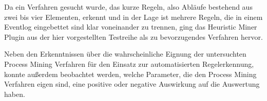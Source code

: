 \begin{table}[!htbp]
\centering
{}
\caption{Ergebnisse der Auswertung der Versuchsreihe}
\label{tab:results_short}
\end{table}

Da ein Verfahren gesucht wurde, das kurze Regeln, also Abläufe bestehend aus zwei bis vier Elementen, erkennt und  in der Lage ist mehrere Regeln, die in einem Eventlog eingebettet sind klar voneinander zu trennen, ging das Heuristic Miner Plugin aus der hier vorgestellten Testreihe als zu bevorzugendes Verfahren hervor.

Neben den Erkenntnissen über die wahrscheinliche Eignung der untersuchten Process Mining Verfahren für den Einsatz zur automatisierten Regelerkennung, konnte außerdem beobachtet werden, welche Parameter, die den Process Mining Verfahren eigen sind, eine positive oder negative Auswirkung auf die Auswertung haben. 

